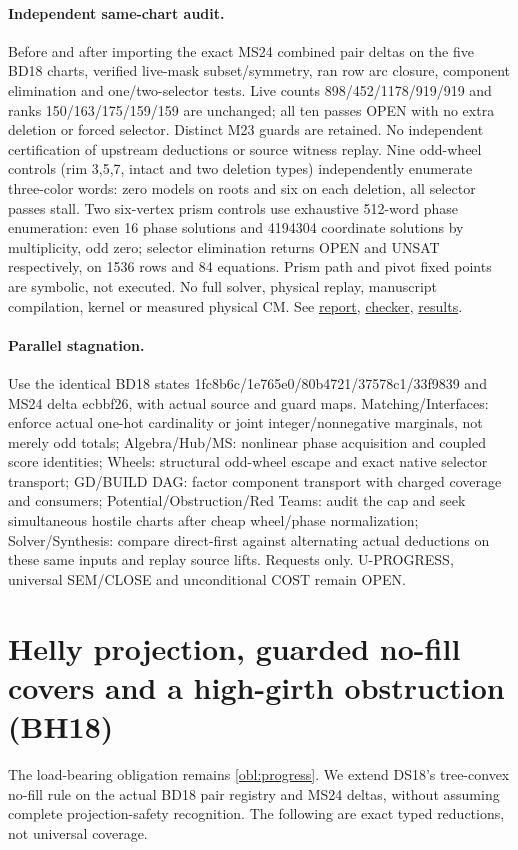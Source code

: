 \documentclass[11pt]{article}
\begin{document}
\paragraph{Independent same-chart audit.}
Before and after importing the exact MS24 combined pair deltas on the five BD18 charts, verified live-mask subset/symmetry, ran row arc closure, component elimination and one/two-selector tests. Live counts 898/452/1178/919/919 and ranks 150/163/175/159/159 are unchanged; all ten passes OPEN with no extra deletion or forced selector. Distinct M23 guards are retained. No independent certification of upstream deductions or source witness replay. Nine odd-wheel controls (rim 3,5,7, intact and two deletion types) independently enumerate three-color words: zero models on roots and six on each deletion, all selector passes stall. Two six-vertex prism controls use exhaustive 512-word phase enumeration: even 16 phase solutions and 4194304 coordinate solutions by multiplicity, odd zero; selector elimination returns OPEN and UNSAT respectively, on 1536 rows and 84 equations. Prism path and pivot fixed points are symbolic, not executed. No full solver, physical replay, manuscript compilation, kernel or measured physical CM. See \href{https://github.com/j15marti/pnp/commit/2c386af366a4e3e1ceb52bf39baf3dc4321d3246}{report}, \href{https://github.com/j15marti/pnp/commit/ba2928377f66d6dec21d87dd1f5f3cf312b1bb8f}{checker}, \href{https://github.com/j15marti/pnp/commit/c83d5d3f97a35d5426899e1236bf96831e21fa32}{results}.
\paragraph{Parallel stagnation.}
Use the identical BD18 states 1fc8b6c/1e765e0/80b4721/37578c1/33f9839 and MS24 delta ecbbf26, with actual source and guard maps. Matching/Interfaces: enforce actual one-hot cardinality or joint integer/nonnegative marginals, not merely odd totals; Algebra/Hub/MS: nonlinear phase acquisition and coupled score identities; Wheels: structural odd-wheel escape and exact native selector transport; GD/BUILD DAG: factor component transport with charged coverage and consumers; Potential/Obstruction/Red Teams: audit the cap and seek simultaneous hostile charts after cheap wheel/phase normalization; Solver/Synthesis: compare direct-first against alternating actual deductions on these same inputs and replay source lifts. Requests only. U-PROGRESS, universal SEM/CLOSE and unconditional COST remain OPEN.


\section{Helly projection, guarded no-fill covers and a high-girth obstruction (BH18)}\label{sec:bh18}
The load-bearing obligation remains \ref{obl:progress}. We extend DS18's tree-convex no-fill rule on the actual BD18 pair registry and MS24 deltas, without assuming complete projection-safety recognition. The following are exact typed reductions, not universal coverage.
\end{document}
